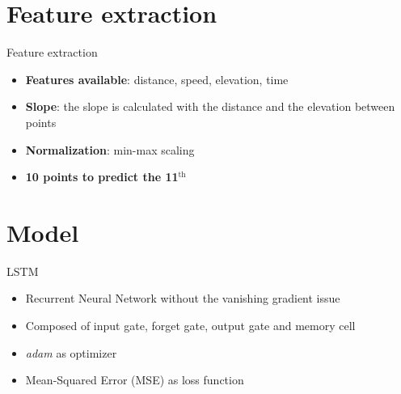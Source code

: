 \documentclass[aspectratio=169]{beamer}
\begin{document}
\section{Feature extraction}

\begin{frame}{Feature extraction}
	\begin{itemize}
    	\item \textbf{Features available}: distance, speed, elevation, time
		\item \textbf{Slope}: the slope is calculated with the distance and the elevation between points
        \item \textbf{Normalization}: min-max scaling
        \item \textbf{10 points to predict the 11$^{\text{th}}$}
	\end{itemize}
\end{frame}


\section{Model}

\begin{frame}{LSTM}
	\begin{itemize}
    	\item Recurrent Neural Network without the vanishing gradient issue
        \item Composed of input gate, forget gate, output gate and memory cell
        \item \textit{adam} as optimizer
        \item Mean-Squared Error (MSE) as loss function
    \end{itemize}
\end{frame}

\end{document}
